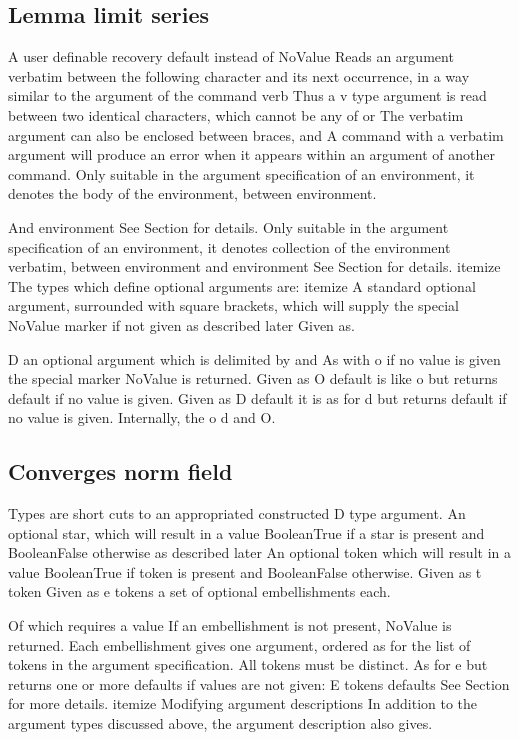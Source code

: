 \documentclass{article}
\begin{document}
\subsection{Lemma limit series}
A user definable recovery default instead of NoValue Reads an argument verbatim between the following character and its next occurrence, in a way similar to the argument of the command verb Thus a v type argument is read between two identical characters, which cannot be any of or The verbatim argument can also be enclosed between braces, and A command with a verbatim argument will produce an error when it appears within an argument of another command. Only suitable in the argument specification of an environment, it denotes the body of the environment, between environment.

And environment See Section for details. Only suitable in the argument specification of an environment, it denotes collection of the environment verbatim, between environment and environment See Section for details. itemize The types which define optional arguments are: itemize A standard optional argument, surrounded with square brackets, which will supply the special NoValue marker if not given as described later Given as.

D an optional argument which is delimited by and As with o if no value is given the special marker NoValue is returned. Given as O default is like o but returns default if no value is given. Given as D default it is as for d but returns default if no value is given. Internally, the o d and O.

\subsection{Converges norm field}
Types are short cuts to an appropriated constructed D type argument. An optional star, which will result in a value BooleanTrue if a star is present and BooleanFalse otherwise as described later An optional token which will result in a value BooleanTrue if token is present and BooleanFalse otherwise. Given as t token Given as e tokens a set of optional embellishments each.

Of which requires a value If an embellishment is not present, NoValue is returned. Each embellishment gives one argument, ordered as for the list of tokens in the argument specification. All tokens must be distinct. As for e but returns one or more defaults if values are not given: E tokens defaults See Section for more details. itemize Modifying argument descriptions In addition to the argument types discussed above, the argument description also gives.
\end{document}
